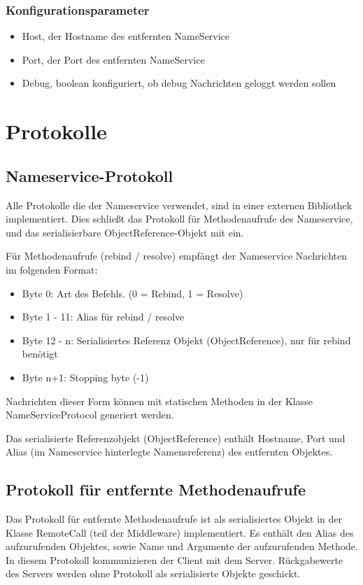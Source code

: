 \documentclass{article}
\begin{document}
\subsubsection{Konfigurationsparameter}

\begin{itemize}
    \item Host, der Hostname des entfernten NameService
    \item Port, der Port des entfernten NameService
	\item Debug, boolean konfiguriert, ob debug Nachrichten geloggt werden sollen
\end{itemize}

\section{Protokolle}
\subsection{Nameservice-Protokoll}
Alle Protokolle die der Nameservice verwendet, sind in einer externen Bibliothek implementiert.
Dies schließt das Protokoll für Methodenaufrufe des Nameservice, und das serialisierbare
ObjectReference-Objekt mit ein.

Für Methodenaufrufe (rebind / resolve) empfängt der Nameservice Nachrichten im folgenden Format:
\begin{itemize}
\item Byte 0: Art des Befehls. (0 = Rebind, 1 = Resolve)
\item Byte 1 - 11: Alias für rebind / resolve
\item Byte 12 - n: Serialisiertes Referenz Objekt (ObjectReference), nur für rebind benötigt
\item Byte n+1: Stopping byte (-1)
\end{itemize}

Nachrichten dieser Form können mit statischen Methoden in der Klasse NameServiceProtocol generiert werden.

Das serialisierte Referenzobjekt (ObjectReference) enthält Hostname, Port und Alias (im Nameservice hinterlegte Namensreferenz) des 
entfernten Objektes.

\subsection{Protokoll für entfernte Methodenaufrufe}

Das Protokoll für entfernte Methodenaufrufe ist als serialisiertes Objekt in der Klasse 
RemoteCall (teil der Middleware) implementiert. Es enthält den Alias des aufzurufenden Objektes,
sowie Name und Argumente der aufzurufenden Methode.
In diesem Protokoll kommunizieren der Client mit dem Server.
Rückgabewerte des Servers werden ohne Protokoll als serialisierte Objekte geschickt.
\end{document}
